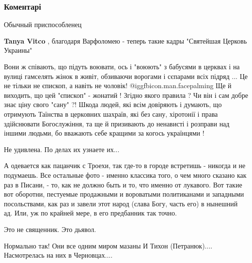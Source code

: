  
 
 
 
 
\subsubsection{Коментарі}
\label{sec:30_10_2021.fb.molchanov_jurij.1.episkop_adrian_kulik.cmt}

\begin{itemize} %
Обычный приспособленец


\textbf{Tanya Vitco} , благодаря Варфоломею - теперь такие кадры "Святейшая Церковь Украины"


Вони ж співають, що підуть воювати, ось і "воюють" з бабусями в церквах і на
вулиці гамселять жінок в живіт, обзиваючи ворогами і сєпарами всіх підряд ...
Це не тільки не єпископ, а навіть не чоловік!  @igg{fbicon.man.facepalming}  Ще й виходить, що цей
"єпископ" - жонатий ! Згідно якого правила ? Чи він і сам добре знає ціну свого
"сану" ?! Шкода людей, які всім довіряють і думають, що отримують Таїнства в
церковних шахраїв, які без сану, хіротонії і права здійснювати Богослужіння, та
ще й призивають до ненависті і розправи над іншими людьми, бо вважають себе
кращими за когось українцями !

Не удивлена. По делах их узнаете их...


А одевается как пацанчик с Троехи, так где-то в городе встретишь - никогда и не
подумаешь. Все остальные фото - именно классика того, о чем много сказано как
раз в Писани, - то, как не должно быть и то, что именно от лукавого. Вот такие
вот оборотни, пестуемые продажными и вороватыми политиканами и западными
посольствами, как раз и завели этот народ (слава Богу, часть его) в нынешний
ад. Или, уж по крайней мере, в его предбанник так точно.

Это не священник. Это дьявол.

Нормально так! Они все одним миром мазаны И Тихон (Петранюк).... Насмотрелась на них в Черновцах....


\end{itemize}
